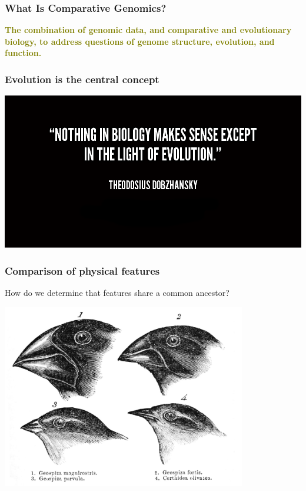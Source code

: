 




%
\begin{frame}
  \frametitle{What Is Comparative Genomics?}
  \Large{
    \textcolor{olive}{
      \textbf{
      The combination of genomic data, and comparative and evolutionary biology, to address questions of   genome structure, evolution, and function.
      }
    }
  }
\end{frame}

%
\begin{frame}
  \frametitle{Evolution is the central concept}
  \begin{center}
    \includegraphics[width=\textwidth]{images/dobzhansky_quote}
  \end{center}  
\end{frame}

%
\begin{frame}
  \frametitle{Comparison of physical features}
  How do we determine that features share a common ancestor? \\
  \begin{center}
    \includegraphics[width=0.8\textwidth]{images/darwin_finches}
  \end{center}  
\end{frame}

